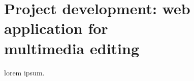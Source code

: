 \chapter{Project development: web application for \\ multimedia editing}
\label{ch:ch3_ProjectDevelopment}


lorem ipsum.